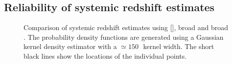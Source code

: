 \subsection{Reliability of systemic redshift estimates}
\label{sec:ch4_redshifts}

\begin{figure}
   \captionsetup[subfigure]{labelformat=empty}
    \centering
    \subfloat[\label{fig:redshift_comparison_a}]{}
    \subfloat[\label{fig:redshift_comparison_b}]{}
    \subfloat[\label{fig:redshift_comparison_c}]{}
    \caption[{Comparison of systemic redshift estimates using [], broad \hb and broad \hans.}]{Comparison of systemic redshift estimates using [], broad \hb and broad \hans. The probability density functions are generated using a Gaussian kernel density estimator with a $\simeq150$\,\kms\, kernel width. The short black lines show the locations of the individual points.}       
    \label{fig:redshift_comparison}
\end{figure}

